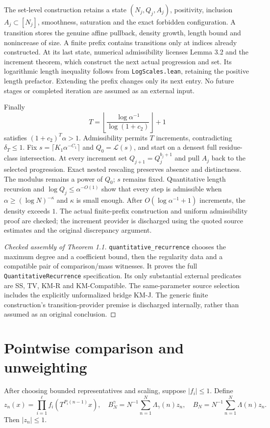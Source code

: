 The set-level construction retains a state $(N_j,Q_j,A_j)$, positivity, inclusion $A_j\subset[N_j]$, smoothness, saturation and the exact forbidden configuration. A transition stores the genuine affine pullback, density growth, length bound and nonincrease of size. A finite prefix contains transitions only at indices already constructed. At its last state, numerical admissibility licenses Lemma 3.2 and the increment theorem, which construct the next actual progression and set. Its logarithmic length inequality follows from \texttt{LogScales.lean}, retaining the positive length prefactor. Extending the prefix changes only its next entry. No future stages or completed iteration are assumed as an external input.

Finally
\[
 T=\left\lfloor\frac{\log\alpha^{-1}}{\log(1+c_2)}\right\rfloor+1
\]
satisfies $(1+c_2)^T\alpha>1$. Admissibility permits $T$ increments, contradicting $\delta_T\leq1$.
\else
Fix $s=\lceil K_1\alpha^{-C_1}\rceil$ and $Q_0=\mathcal L(s)$, and start on a densest full residue-class intersection. At every increment set $Q_{j+1}=Q_j^{b_j+1}$ and pull $A_j$ back to the selected progression. Exact nested rescaling preserves absence and distinctness. The modulus remains a power of $Q_0$; $s$ remains fixed. Quantitative length recursion and $\log Q_j\leq\alpha^{-O(1)}$ show that every step is admissible when $\alpha\geq(\log N)^{-\kappa}$ and $\kappa$ is small enough. After $O(\log\alpha^{-1}+1)$ increments, the density exceeds $1$. The actual finite-prefix construction and uniform admissibility proof are checked; the increment provider is discharged using the quoted source estimates and the original discrepancy argument.
\fi
\begin{proof}[Checked assembly of Theorem 1.1]
\leanok
\texttt{quantitative\_\allowbreak{}recurrence} chooses the maximum degree and a coefficient bound, then the regularity data and a compatible pair of comparison/mass witnesses. It proves the full \texttt{QuantitativeRecurrence} specification. Its only substantial external predicates are SS, TV, KM-R and KM-Compatible. The same-parameter source selection includes the explicitly unformalized bridge KM-J. The generic finite construction's transition-provider premise is discharged internally, rather than assumed as an original conclusion.
\end{proof}

\section{Pointwise comparison and unweighting}
\begin{definition}\label{def:averages}
After choosing bounded representatives and scaling, suppose $|f_i|\leq1$. Define
\[
 z_n(x)=\prod_{i=1}^{\ell}f_i(T^{P_i(n-1)}x),\quad
 B_N^\gamma=N^{-1}\sum_{n=1}^N\Lambda_\gamma(n)z_n,\quad
 B_N=N^{-1}\sum_{n=1}^N\Lambda(n)z_n.
\]
Then $|z_n|\leq1$.
\end{definition}


